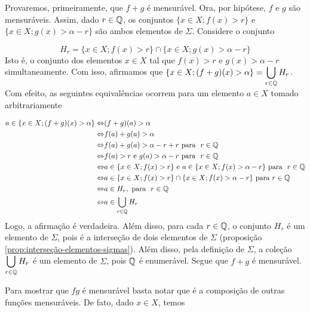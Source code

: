 \begin{prova}
    
    Provaremos, primeiramente, que $f+g$ é mensurável. Ora, por hipótese, $f$ e $g$ são mensuráveis. Assim, dado $r \in \operatorname{\mathbb{Q}}$, os conjuntos $\{x \in X; f(x) > r\}$ e 
        $\{x \in X; g(x) > \alpha -r\}$ são ambos elementos de $\Sigma$.
        Considere o conjunto  
        
        $$H_r = \{x \in X; f(x) > r\} \cap \{x \in X; g(x) > \alpha -r\}$$
        Isto é, o conjunto dos elementos $x \in X$ tal que $f(x) 
        > r$ e $g(x) >\alpha -r$ simultaneamente.
        Com isso, afirmamos que $\{x \in X; (f+g)(x) > \alpha\} = \displaystyle \bigcup_{r \in \operatorname{\mathbb{Q}}} H_r$. Com efeito, as seguintes equivalências ocorrem para um elemento $a \in X$ tomado arbitrariamente

        \begin{align*}
            a \in \{x \in X; (f+g)(x) > \alpha\} 
            \Leftrightarrow  & (f+g)(a) >\alpha \\
            \Leftrightarrow & f(a) +g(a) > \alpha \\
            \Leftrightarrow & f(a) + g(a) > \alpha -r + r\ \textrm{para } \ r \in \Q\\
            \Leftrightarrow & f(a) > r \textrm{\ e\ } g(a) > \alpha -r\ \textrm{para  } \ r \in \Q\\
            \Leftrightarrow & a \in \{x \in X; f(x) > r\} \textrm{\ e\ } a \in \{x \in X; f(x) > \alpha - r\}\  \textrm{para  } \ r \in \Q\\
            \Leftrightarrow & a \in \{x \in X; f(x) > r\} \cap \{x \in X; f(x) > \alpha - r\}\  \textrm{para  }  r \in \Q\\
            \Leftrightarrow & a \in H_r,\ \textrm{para  } \ r \in \Q\\
            \Leftrightarrow &a \in \bigcup_{r \in \Q} H_r
        \end{align*}
    Logo, a afirmação é verdadeira. Além disso, para cada $r \in \operatorname{\mathbb{Q}}$, o conjunto $H_r$ é um elemento de $\Sigma$, pois é  a interseção de dois elementos de $\Sigma$ (proposição \ref{prop:interseção-elementos-sigmas}).
    Além disso, pela definição de $\Sigma$, a coleção $\displaystyle \bigcup_{r \in \operatorname{\mathbb{Q}}} H_r$ é um elemento de $\Sigma$, pois $\operatorname{\mathbb{Q}}$ é enumerável.
    Segue que $f+g$ é mensurável.

    Para mostrar que $fg$ é mensurável basta notar que é a composição de outras funções mensuráveis.
    De fato, dado $x \in X$, temos


\end{prova}
